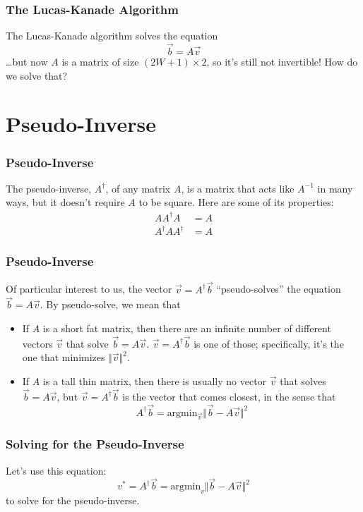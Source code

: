 \documentclass{beamer}
\begin{document}
\begin{frame}
  \frametitle{The Lucas-Kanade Algorithm}

  The Lucas-Kanade algorithm solves the equation
  \[\vec{b}=A\vec{v} \]
  \ldots but now $A$ is a matrix of size $(2W+1)\times 2$, so it's
  still not invertible!  How do we solve that?
\end{frame}

\section[Pseudo-Inverse]{Pseudo-Inverse}
\setcounter{subsection}{1}

\begin{frame}
  \frametitle{Pseudo-Inverse}

  The pseudo-inverse, $A^\dag$, of any matrix $A$, is a matrix that
  acts like $A^{-1}$ in many ways, but it doesn't require $A$ to be
  square.  Here are some of its properties:
  \begin{align*}
    A A^\dag A &= A\\
    A^\dag A A^\dag &= A
  \end{align*}
\end{frame}

\begin{frame}
  \frametitle{Pseudo-Inverse}

  Of particular interest to us, the vector $\vec{v}=A^\dag\vec{b}$
  ``pseudo-solves'' the equation $\vec{b}=A\vec{v}$.  By pseudo-solve, we
  mean that
  \begin{itemize}
  \item If $A$ is a short fat matrix, then there are an infinite
    number of different vectors $\vec{v}$ that solve
    $\vec{b}=A\vec{v}$.  $\vec{v}=A^\dag \vec{b}$ is one of those;
    specifically, it's the one that minimizes $\Vert\vec{v}\Vert^2$.
  \item If $A$ is a tall thin matrix, then there is usually no vector
    $\vec{v}$ that solves $\vec{b}=A\vec{v}$, but $\vec{v}=A^\dag
    \vec{b}$ is the vector that comes closest, in the sense that 
    \[
    A^\dag\vec{b} = \mbox{argmin}_{\vec{v}}\Vert\vec{b}-A\vec{v}\Vert^2
    \]
  \end{itemize}
\end{frame}


\begin{frame}
  \frametitle{Solving for the Pseudo-Inverse}

  Let's use this equation:
  \[
  v^* = A^\dag\vec{b} = \mbox{argmin}_v\Vert\vec{b}-A\vec{v}\Vert^2
  \]
  to solve for the pseudo-inverse.
\end{frame}
\end{document}
